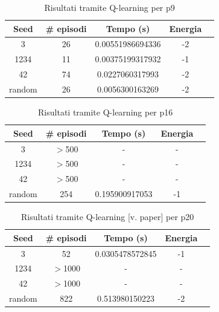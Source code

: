 \documentclass[conference]{IEEEtran}
\begin{document}
\begin{table}[H]
\begin{center}
\begin{tabular}{|c|c|c|c|c|}
\hline
\textbf{Seed} & \textbf{\# episodi} & \textbf{Tempo (s)} & \textbf{Energia} \\ \hline
3 & 26 & 0.00551986694336 & -2 \\ \hline
1234 & 11 & 0.00375199317932 & -1 \\ \hline
42 & 74 & 0.0227060317993 & -2 \\ \hline
random & 26 & 0.0056300163269 & -2 \\ \hline
\end{tabular}
\end{center}
\caption{Risultati tramite Q-learning per p9}
\end{table}

\begin{table}[H]
\begin{center}
\begin{tabular}{|c|c|c|c|c|}
\hline
\textbf{Seed} & \textbf{\# episodi} & \textbf{Tempo (s)} & \textbf{Energia} \\ \hline
3 & $>$500 & - & - \\ \hline
1234 & $>$500 & - & - \\ \hline
42 & $>$500 & - & - \\ \hline
random & 254 & 0.195900917053 & -1 \\ \hline
\end{tabular}
\end{center}
\caption{Risultati tramite Q-learning per p16}
\end{table}

\begin{table}[H]
\begin{center}
\begin{tabular}{|c|c|c|c|c|}
\hline
\textbf{Seed} & \textbf{\# episodi} & \textbf{Tempo (s)} & \textbf{Energia} \\ \hline
3 & 52 & 0.0305478572845 & -1 \\ \hline
1234 & $>$1000 & - & - \\ \hline
42 & $>$1000 & - & - \\ \hline
random & 822 & 0.513980150223 & -2 \\ \hline
\end{tabular}
\end{center}
\caption{Risultati tramite Q-learning [v. paper] per p20}
\end{table}
\end{document}
